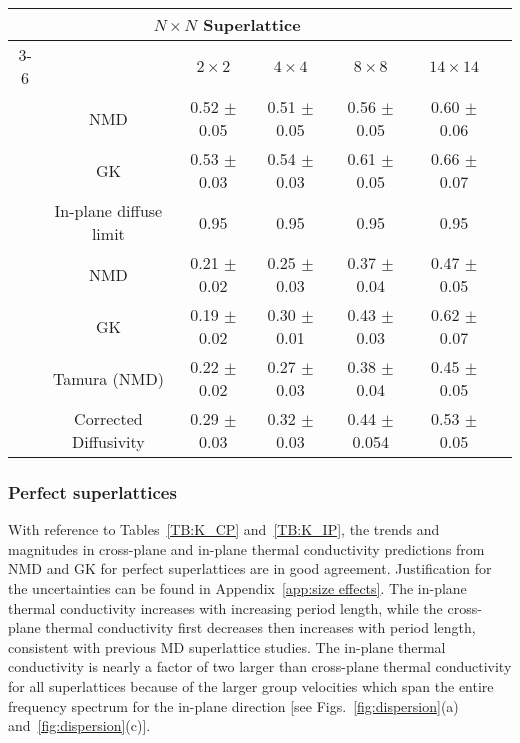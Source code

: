 \documentclass[aps,prb,preprint,preprintnumbers,amsmath,amssymb,floatfix,superscriptaddress]{revtex4}
\begin{document}
\begin{table*}
\begin{center}
\begin{tabular*}{\textwidth}{c@{\extracolsep{\fill}}cccccc}
\hline\hline\noalign{\smallskip}
\multicolumn{2}{c}{\multirow{2}{*}{In-Plane}}&\multicolumn{4}{c}{$N\times N$ Superlattice} \\
\cline{3-6}\noalign{\smallskip}
\hspace{1cm} && $2\times2$ & $4\times4$ & $8\times8$ & $14\times14$  \\
\noalign{\smallskip}\hline\noalign{\smallskip}
\multirow{2}{*}{Perfect} &NMD &0.52 $\pm$ 0.05 & 0.51 $\pm$ 0.05& 0.56 $\pm$ 0.05& 0.60 $\pm$ 0.06\\
&GK &0.53 $\pm$ 0.03 &  0.54 $\pm$ 0.03 &  0.61 $\pm$ 0.05  &  0.66 $\pm$ 0.07 \\
&In-plane diffuse limit & 0.95 & 0.95 & 0.95 & 0.95\\
\noalign{\smallskip}\hline
\multirow{3}{*}{Mixed 80/20} & NMD &0.21 $\pm$ 0.02 & 0.25 $\pm$ 0.03 & 0.37 $\pm$ 0.04 & 0.47  $\pm$ 0.05\\
&GK & 0.19 $\pm$ 0.02 &  0.30 $\pm$ 0.01  & 0.43 $\pm$ 0.03 &  0.62 $\pm$ 0.07 \\   
&Tamura (NMD)& 0.22 $\pm$ 0.02 & 0.27 $\pm$ 0.03 & 0.38 $\pm$ 0.04 & 0.45 $\pm$ 0.05\\
&Corrected Diffusivity & 0.29 $\pm$ 0.03& 0.32 $\pm$ 0.03& 0.44 $\pm$ 0.054&0.53 $\pm$ 0.05\\
\hline\hline
\end{tabular*}
\end{center}
\renewcommand{\table}{Table.}
\caption{In-plane thermal conductivity predictions [W/m-K].}
\label{TB:K_IP}
\end{table*}
\subsubsection{Perfect superlattices}
With reference to Tables~\ref{TB:K_CP} and~\ref{TB:K_IP}, the trends and magnitudes in cross-plane and in-plane thermal conductivity predictions from NMD and GK for perfect superlattices are in good agreement. Justification for the uncertainties can be found in Appendix~\ref{app:size effects}. The in-plane thermal conductivity increases with increasing period length, while the cross-plane thermal conductivity first decreases then increases with period length, consistent with previous MD superlattice studies.\cite {PhysRevB.77.184302,PhysRevB.72.174302} The in-plane thermal conductivity is nearly a factor of two larger than cross-plane thermal conductivity for all superlattices because of the larger group velocities which span the entire frequency spectrum for the in-plane direction [see Figs.~\ref{fig:dispersion}(a) and~\ref{fig:dispersion}(c)]. 
\end{document}
